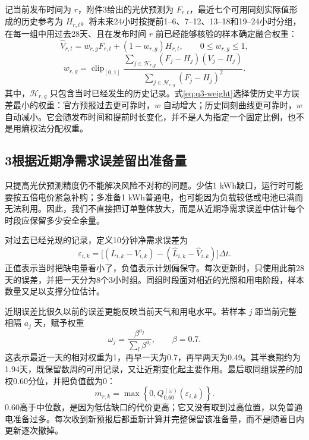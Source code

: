 记当前发布时间为 $r$，附件3给出的光伏预测为 $F_{r,t}$，最近七个可用同刻实际值形成的历史参考为 $H_{r,t}$。将未来24小时按提前1--6、7--12、13--18和19--24小时分组，在每一组中用过去28天、且在发布时间 $r$ 前已经能够核验的样本确定融合权重：
\begin{equation}
\widehat V_{r,t}=w_{r,g}F_{r,t}+(1-w_{r,g})H_{r,t},
\qquad 0\le w_{r,g}\le1,
\label{eq:q3-fusion}
\end{equation}
\begin{equation}
w_{r,g}=\operatorname{clip}_{[0,1]}
\frac{\sum_{j\in\mathcal H_{r,g}}(F_j-H_j)(V_j-H_j)}
{\sum_{j\in\mathcal H_{r,g}}(F_j-H_j)^2}.
\label{eq:q3-weight}
\end{equation}
其中，$\mathcal H_{r,g}$ 只包含当时已经发生的历史记录。式\eqref{eq:q3-weight}选择使历史平方误差最小的权重：官方预报过去更可靠时，$w$ 自动增大；历史同刻曲线更可靠时，$w$ 自动减小。它会随发布时间和提前时长变化，并不是人为指定一个固定比例，也不是用熵权法分配权重。

\subsection*{3\quad 根据近期净需求误差留出准备量}

只提高光伏预测精度仍不能解决风险不对称的问题。少估1 kWh缺口，运行时可能要按五倍电价紧急补购；多准备1 kWh普通电，也可能因为负载较低或电池已满而无法利用。因此，我们不直接把订单整体放大，而是从近期净需求误差中估计每个时段应保留多少安全余量。

对过去已经兑现的记录，定义10分钟净需求误差为
\begin{equation}
\varepsilon_{i,k}=
\big[(L_{i,k}-V_{i,k})-(\widehat L_{i,k}-\widehat V_{i,k})\big]\Delta t.
\label{eq:q3-error}
\end{equation}
正值表示当时把缺电量看小了，负值表示计划偏保守。每次更新时，只使用此前28天的误差，并把一天分为8个3小时组。同组时段面对相近的光照和用电阶段，样本数量又足以支撑分位估计。

近期误差比很久以前的误差更能反映当前天气和用电水平。若样本 $j$ 距当前完整相隔 $a_j$ 天，赋予权重
\begin{equation}
\omega_j=\frac{\beta^{a_j}}{\sum_l\beta^{a_l}},\qquad \beta=0.7.
\label{eq:q3-decay}
\end{equation}
这表示最近一天的相对权重为1，再早一天为0.7，再早两天为0.49。其半衰期约为1.94天，既保留数周的可用记录，又让近期变化起主要作用。最后取同组误差的加权0.60分位，并把负值截为0：
\begin{equation}
m_{r,k}=\max\left\{0,Q_{0.60}^{(\omega)}(\varepsilon_{i,k})\right\}.
\label{eq:q3-margin}
\end{equation}
0.60高于中位数，是因为低估缺口的代价更高；它又没有取到过高位置，以免普通电准备过多。每次收到新预报后都重新计算并完整保留该准备量，而不是随着日内更新逐次撤掉。

